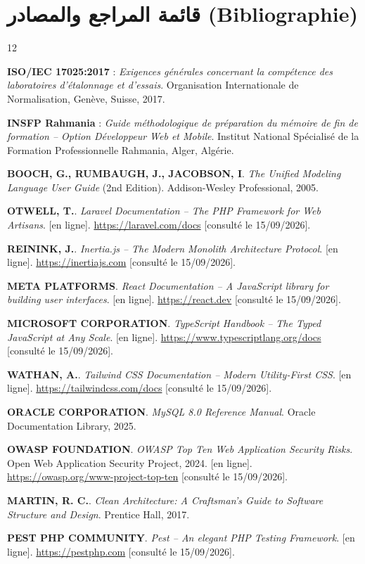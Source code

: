 \documentclass{bts-report-ar}
\begin{document}
\chapter*{قائمة المراجع والمصادر (Bibliographie)}

\begin{thebibliography}{12}

\textbf{ISO/IEC 17025:2017} : \textit{Exigences g\'en\'erales concernant la comp\'etence des laboratoires d'\'etalonnage et d'essais}. Organisation Internationale de Normalisation, Gen\`eve, Suisse, 2017.

\textbf{INSFP Rahmania} : \textit{Guide m\'ethodologique de pr\'eparation du m\'emoire de fin de formation -- Option D\'eveloppeur Web et Mobile}. Institut National Sp\'ecialis\'e de la Formation Professionnelle Rahmania, Alger, Alg\'erie.

\textbf{BOOCH, G., RUMBAUGH, J., JACOBSON, I}. \textit{The Unified Modeling Language User Guide} (2nd Edition). Addison-Wesley Professional, 2005.

\textbf{OTWELL, T.}. \textit{Laravel Documentation -- The PHP Framework for Web Artisans}. [en ligne]. \url{https://laravel.com/docs} [consult\'e le 15/09/2026].

\textbf{REININK, J.}. \textit{Inertia.js -- The Modern Monolith Architecture Protocol}. [en ligne]. \url{https://inertiajs.com} [consult\'e le 15/09/2026].

\textbf{META PLATFORMS}. \textit{React Documentation -- A JavaScript library for building user interfaces}. [en ligne]. \url{https://react.dev} [consult\'e le 15/09/2026].

\textbf{MICROSOFT CORPORATION}. \textit{TypeScript Handbook -- The Typed JavaScript at Any Scale}. [en ligne]. \url{https://www.typescriptlang.org/docs} [consult\'e le 15/09/2026].

\textbf{WATHAN, A.}. \textit{Tailwind CSS Documentation -- Modern Utility-First CSS}. [en ligne]. \url{https://tailwindcss.com/docs} [consult\'e le 15/09/2026].

\textbf{ORACLE CORPORATION}. \textit{MySQL 8.0 Reference Manual}. Oracle Documentation Library, 2025.

\textbf{OWASP FOUNDATION}. \textit{OWASP Top Ten Web Application Security Risks}. Open Web Application Security Project, 2024. [en ligne]. \url{https://owasp.org/www-project-top-ten} [consult\'e le 15/09/2026].

\textbf{MARTIN, R. C.}. \textit{Clean Architecture: A Craftsman's Guide to Software Structure and Design}. Prentice Hall, 2017.

\textbf{PEST PHP COMMUNITY}. \textit{Pest -- An elegant PHP Testing Framework}. [en ligne]. \url{https://pestphp.com} [consult\'e le 15/09/2026].

\end{thebibliography}
\end{document}
